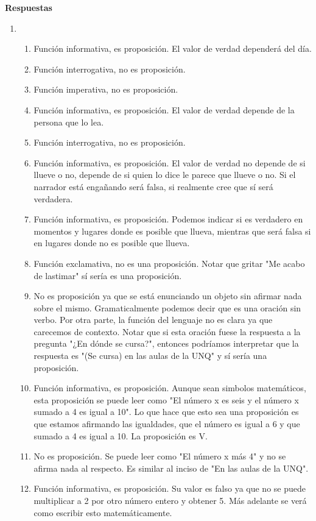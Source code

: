 \documentclass[a4paper]{article}
\newcommand{\exercise}{\item}
\begin{document}
 \textbf{Respuestas}\begin{enumerate}\exercise\begin{enumerate} [label=(\alph*)]		\item Función informativa, es proposición. El valor de verdad dependerá del día.
		\item Función interrogativa, no es proposición.
		\item Función imperativa, no es proposición.
		\item Función informativa, es proposición. El valor de verdad depende de la persona que lo lea.
		\item Función interrogativa, no es proposición.
		\item Función informativa, es proposición. El valor de verdad no depende de si llueve o no, depende de si quien lo dice le parece que llueve o no. Si el narrador está engañando será falsa, si realmente cree que sí será verdadera.
		\item Función informativa, es proposición. Podemos indicar si es verdadero en momentos y lugares donde es posible que llueva, mientras que será falsa si en lugares donde no es posible que llueva.
		\item Función exclamativa, no es una proposición. Notar que gritar "Me acabo de lastimar" sí sería es una proposición.
		\item No es proposición ya que se está enunciando un objeto sin afirmar nada sobre el mismo. Gramaticalmente podemos decir que es una oración sin verbo. Por otra parte, la función del lenguaje no es clara ya que carecemos de contexto. Notar que si esta oración fuese la respuesta a la pregunta "¿En dónde se cursa?", entonces podríamos interpretar que la respuesta es "(Se cursa) en las aulas de la UNQ" y sí sería una proposición.
		\item Función informativa, es proposición. Aunque sean simbolos matemáticos, esta proposición se puede leer como "El número x es seis y el número x sumado a 4 es igual a 10". Lo que hace que esto sea una proposición es que estamos afirmando las igualdades, que el número es igual a 6 y que sumado a 4 es igual a 10. La proposición es V.
		\item No es proposición. Se puede leer como "El número x más 4" y no se afirma nada al respecto. Es similar al inciso de "En las aulas de la UNQ".
		\item Función informativa, es proposición. Su valor es falso ya que no se puede multiplicar a 2 por otro número entero y obtener 5. Más adelante se verá como escribir esto matemáticamente.

\end{enumerate}
\end{enumerate}
\end{document}
